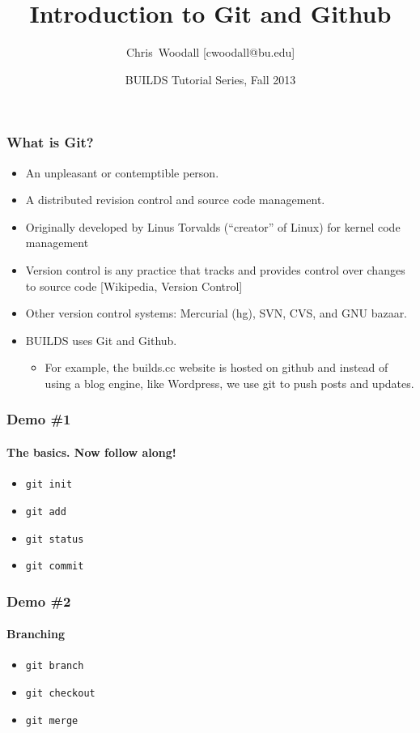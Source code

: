 \documentclass{beamer}
\title %
{Introduction to Git and Github}
\subtitle{}
\author[Woodall, Chris] %
{Chris~Woodall [cwoodall@bu.edu]}
\institute[BUILDS] %
{
  \inst{1}%
  BUILDS\\
  Boston University
}
\date[BUILDS 2013] %
{BUILDS Tutorial Series, Fall 2013}
\begin{document}
  \frame{\titlepage}
  \begin{frame}
    \frametitle{What is Git?}
    \begin{itemize}
    	\item An unpleasant or contemptible person.
    	\item A distributed revision control and source code management.
    	\item Originally developed by Linus Torvalds (``creator'' of Linux) for kernel code management
		\item Version control is any practice that tracks and provides control over changes to source code [Wikipedia, Version Control]
		\item Other version control systems: Mercurial (hg), SVN, CVS, and GNU bazaar.
		\item BUILDS uses Git and Github. 
		\begin{itemize}
			\item For example, the builds.cc website is hosted on github and
			instead of using a blog engine, like Wordpress, we use git to push posts and updates.
		\end{itemize}
    \end{itemize}
  \end{frame}

  \begin{frame}
    \frametitle{Demo \#1}
    \framesubtitle{The basics. Now follow along!}

    \begin{itemize}
	    \item \texttt{git init}
	    \item \texttt{git add}
	    \item \texttt{git status}
	    \item \texttt{git commit}
    \end{itemize}
  \end{frame}

  \begin{frame}
    \frametitle{Demo \#2}
    \framesubtitle{Branching}

    \begin{itemize}
	    \item \texttt{git branch}
	    \item \texttt{git checkout}
	    \item \texttt{git merge}
    \end{itemize}
  \end{frame}
\end{document}
